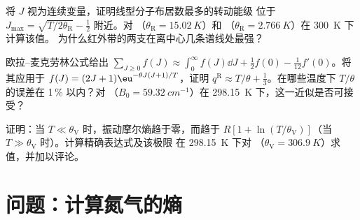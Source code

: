 \begin{exercise}[$\star\star\star$]\label{exo:b3:partition-functions:10}
将 $J$ 视为连续变量，证明线型分子布居数最多的转动能级
位于 $J_{\max} = \sqrt{T/2\theta_{\mathrm R}} - \frac12$ 附近。对 
（$\theta_{\mathrm R} = \qty{15.02}{K}$）和 （$\theta_{\mathrm R} = \qty{2.766}{K}$）在 \qty{300}{K} 下计算该值。
为什么红外带的两支在离中心几条谱线处最强？
\end{exercise}

\begin{exercise}[$\star\star\star$]\label{exo:b3:partition-functions:11}
欧拉–麦克劳林公式给出 $\sum_{J\ge0}f(J) \approx \int_0^\infty f(J)\dd J + \frac12f(0) -
\frac1{12}f'(0)$。将其应用于 $f(J) = (2J+1)\eu^{-\theta J(J+1)/T}$，证明 $q^{\mathrm R} \approx T/\theta +
\frac13$。在哪些温度下 $T/\theta$ 的误差在 1\,\% 以内？对 
（$B_0 = \qty{59.32}{cm^{-1}}$）在 \qty{298.15}{K} 下，这一近似是否可接受？
\end{exercise}

\begin{exercise}[$\star\star\star$]\label{exo:b3:partition-functions:12}
证明：当 $T \ll \theta_{\mathrm V}$ 时，振动摩尔熵趋于零，而趋于
$R[1 + \ln(T/\theta_{\mathrm V})]$（当 $T \gg \theta_{\mathrm V}$ 时）。计算精确表达式及该极限
在 \qty{298.15}{K} 下对 （$\theta_{\mathrm V} = \qty{306.9}{K}$）求值，并加以评论。
\end{exercise}

\section{问题：计算氮气的熵}

